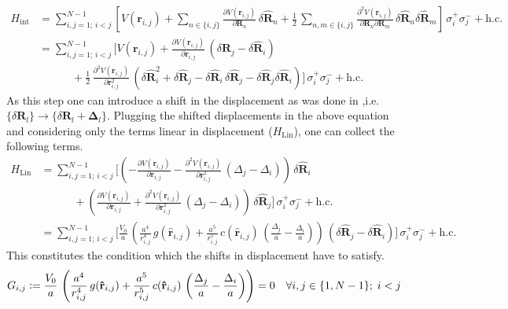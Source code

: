 \begin{align*}
    H_\text{int}&= \sum_{i,j=1;\,i<j}^{N-1}\left[V(\mathbf{r}_{i,j}) + \sum_{n\in\{i,j\}}\frac{\partial V(\mathbf{r}_{i,j})}{\partial\mathbf{R}_{n}}\,\delta\mathbf{\hat{R}}_n +\frac12\,\sum_{n,m\in\{i,j\}}\frac{\partial^2V(\mathbf{r}_{i,j})}{\partial\mathbf{R}_{n}\partial\mathbf{R}_m}\,\delta\mathbf{\hat{R}}_n\delta\mathbf{\hat{R}}_m\right]\,\sigma_i^+\sigma_{j}^-+\text{h.c.}\\
    &= \sum_{i,j=1; \,i<j}^{N-1}\Bigg[V(\mathbf{r}_{i,j}) + \frac{\partial V(\mathbf{r}_{i,j})}{\partial\mathbf{r}_{i,j}}\,(\delta\mathbf{\hat{R}}_{j}-\delta\mathbf{\hat{R}}_i) \\
    &\quad\quad\quad+\frac12\,\frac{\partial^2V(\mathbf{r}_{i,j})}{\partial\mathbf{r}_{i,j}^2}\,\left(\delta\mathbf{\hat{R}}_i^2+\delta\mathbf{\hat{R}}_{j}-\delta\mathbf{\hat{R}}_i\,\delta\mathbf{\hat{R}}_{j}-\delta\mathbf{\hat{R}}_{j}\delta\mathbf{\hat{R}}_i\right)\Bigg]\,\sigma_i^+\sigma_{j}^-+\text{h.c.}
\end{align*}
As this step one can introduce a shift in the displacement as was done in ,i.e. $\{\delta\mathbf{R}_l\}\rightarrow\{\delta{\mathbf{R}}_l+\mathbf{\Delta}_l\}$. Plugging the shifted displacements in the above equation and considering only the terms linear in displacement ($H_\text{Lin}$), one can collect the following terms.
\begin{align*}
    H_\text{Lin}&= \sum_{i,j=1;\,i<j}^{N-1}\Bigg[\left(- \frac{\partial V(\mathbf{r}_{i,j})}{\partial\mathbf{r}_{i,j}}-\frac{\partial^2V(\mathbf{r}_{i,j})}{\partial\mathbf{r}_{i,j}^2}\,({\Delta}_{j}-{\Delta}_i)\right)\,\delta\mathbf{\hat{R}}_{i} \\
    &\quad\quad\quad+\left( \frac{\partial V(\mathbf{r}_{i,j})}{\partial\mathbf{r}_{i,j}}+\frac{\partial^2V(\mathbf{r}_{i,j})}{\partial\mathbf{r}_{i,j}^2}\,({\Delta}_{j}-{\Delta}_i)\right)\,\delta\mathbf{\hat{R}}_{j}\Bigg]\,\sigma_i^+\sigma_{j}^-+\text{h.c.}\\
    &= \sum_{i,j=1;\,i<j}^{N-1}\Bigg[\frac{V_0}{a}\,\left(\frac{a^4}{r_{i,j}^4}\,g(\mathbf{\hat{r}}_{i,j})+\frac{a^5}{r_{i,j}^5}\,c(\mathbf{\hat{r}}_{i,j})\,\left(\frac{{\Delta}_{j}}{a}-\frac{{\Delta}_i}{a}\right)\right)\,(\delta\mathbf{\hat{R}}_{j}-\delta\mathbf{\hat{R}}_{i}) \Bigg]\,\sigma_i^+\sigma_{j}^-+\text{h.c.}
\end{align*}
This constitutes the condition which the shifts in displacement have to satisfy.
\begin{align*}
     G_{i,j}\vcentcolon=\frac{V_0}{a}\,\left(\frac{a^4}{r_{i,j}^4}\,g(\mathbf{\hat{r}}_{i,j})+\frac{a^5}{r_{i,j}^5}\,c(\mathbf{\hat{r}}_{i,j})\,\left(\frac{{\Delta}_{j}}{a}-\frac{{\Delta}_i}{a}\right)\right)=0\quad \forall i,j\in\{1,N-1\};\;i<j
\end{align*}
